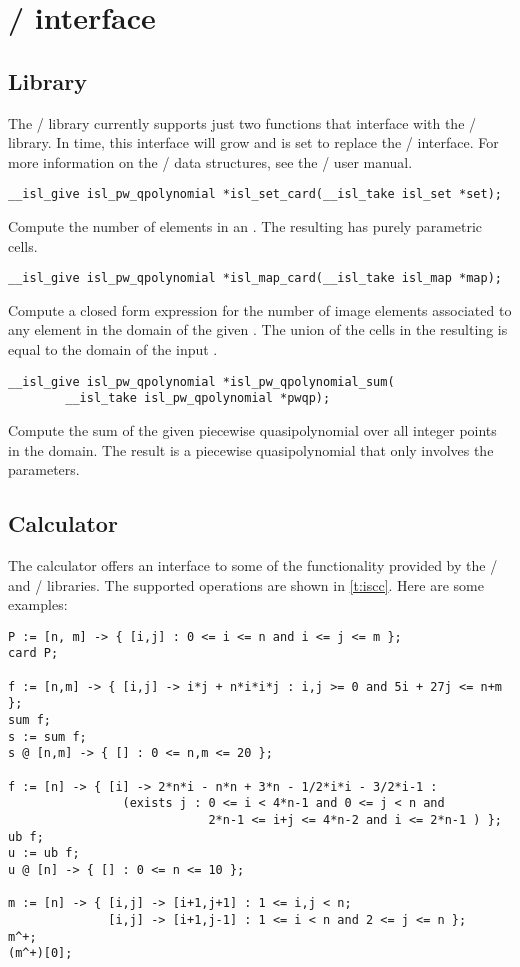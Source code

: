 \section{\protect\isl/ interface}

\subsection{Library}

The \barvinok/ library currently supports just two
functions that interface with the \isl/ library.
In time, this interface will grow and is set to replace
the \PolyLib/ interface.
For more information on the \isl/ data structures, see
the \isl/ user manual.

\begin{verbatim}
__isl_give isl_pw_qpolynomial *isl_set_card(__isl_take isl_set *set);
\end{verbatim}
Compute the number of elements in an .
The resulting  has purely parametric cells.

\begin{verbatim}
__isl_give isl_pw_qpolynomial *isl_map_card(__isl_take isl_map *map);
\end{verbatim}
Compute a closed form expression for the number of image elements
associated to any element in the domain of the given .
The union of the cells in the resulting 
is equal to the domain of the input .

\begin{verbatim}
__isl_give isl_pw_qpolynomial *isl_pw_qpolynomial_sum(
        __isl_take isl_pw_qpolynomial *pwqp);
\end{verbatim}
Compute the sum of the given piecewise quasipolynomial over
all integer points in the domain.  The result is a piecewise
quasipolynomial that only involves the parameters.

\subsection{Calculator}

The  calculator offers an interface to some
of the functionality provided by the \isl/ and \barvinok/
libraries.
The supported operations are shown in \autoref{t:iscc}.
Here are some examples:
\begin{verbatim}
P := [n, m] -> { [i,j] : 0 <= i <= n and i <= j <= m };
card P;

f := [n,m] -> { [i,j] -> i*j + n*i*i*j : i,j >= 0 and 5i + 27j <= n+m };
sum f;
s := sum f;
s @ [n,m] -> { [] : 0 <= n,m <= 20 };

f := [n] -> { [i] -> 2*n*i - n*n + 3*n - 1/2*i*i - 3/2*i-1 :
                (exists j : 0 <= i < 4*n-1 and 0 <= j < n and
                            2*n-1 <= i+j <= 4*n-2 and i <= 2*n-1 ) };
ub f;
u := ub f;
u @ [n] -> { [] : 0 <= n <= 10 };

m := [n] -> { [i,j] -> [i+1,j+1] : 1 <= i,j < n;
              [i,j] -> [i+1,j-1] : 1 <= i < n and 2 <= j <= n };
m^+;
(m^+)[0];
\end{verbatim}

